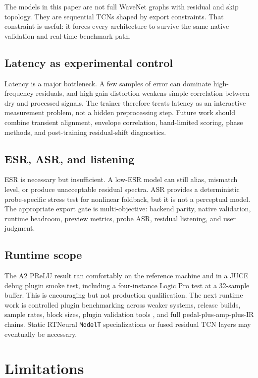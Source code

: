 \documentclass[11pt]{article}
\begin{document}
The models in this paper are not full WaveNet graphs with residual and skip
topology. They are sequential TCNs shaped by export constraints. That
constraint is useful: it forces every architecture to survive the same native
validation and real-time benchmark path.

\subsection{Latency as experimental control}

Latency is a major bottleneck. A few samples of error can dominate
high-frequency residuals, and high-gain distortion weakens simple correlation
between dry and processed signals. The trainer therefore treats latency as an
interactive measurement problem, not a hidden preprocessing step. Future work
should combine transient alignment, envelope correlation, band-limited scoring,
phase methods, and post-training residual-shift diagnostics.

\subsection{ESR, ASR, and listening}

ESR is necessary but insufficient. A low-ESR model can still alias, mismatch
level, or produce unacceptable residual spectra. ASR provides a deterministic
probe-specific stress test for nonlinear foldback, but it is not a perceptual
model. The appropriate export gate is multi-objective: backend parity, native
validation, runtime headroom, preview metrics, probe ASR, residual listening,
and user judgment.

\subsection{Runtime scope}

The A2 PReLU result ran comfortably on the reference machine and in a JUCE
debug plugin smoke test, including a four-instance Logic Pro test at a
32-sample buffer. This is encouraging but not production qualification. The
next runtime work is controlled plugin benchmarking across weaker systems,
release builds, sample rates, block sizes, plugin validation tools
\cite{pluginval}, and full pedal-plus-amp-plus-IR chains. Static RTNeural
\texttt{ModelT} specializations or fused residual TCN layers may eventually be
necessary.

\section{Limitations}
\end{document}
